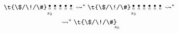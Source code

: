 \begin{primjer}
\begin{multline}
    \t{\$/\!/\#}
    \underset{\mathclap{s_2}}{\begin{array}{@{}c@{}}
    \text\textbullet\\
    \text\textopenbullet
    \end{array}}
    \begin{array}{@{}c@{}}
    \text\textbullet\\
    \text\textopenbullet
    \end{array}
    \begin{array}{@{}c@{}}
    \text\textbullet\\
    \text\textopenbullet
    \end{array}
    \begin{array}{@{}c@{}}
    \text\textbullet\\
    \text\textopenbullet
    \end{array}
    \begin{array}{@{}c@{}}
    \text\textbullet\\
    \text\textopenbullet
    \end{array}
        \leadsto^*
    \t{\$/\!/\#}
    \underset{\mathclap{s_3}}{\begin{array}{@{}c@{}}
    \text\textbullet\\
    \text\textopenbullet
    \end{array}}
    \begin{array}{@{}c@{}}
    \text\textbullet\\
    \text\textopenbullet
    \end{array}
    \begin{array}{@{}c@{}}
    \text\textbullet\\
    \text\textopenbullet
    \end{array}
    \begin{array}{@{}c@{}}
    \text\textbullet\\
    \text\textopenbullet
    \end{array}
    \begin{array}{@{}c@{}}
    \text\textbullet\\
    \text\textopenbullet
    \end{array}
    \begin{array}{@{}c@{}}
    \text\textbullet\\
    \text\textopenbullet
    \end{array}
        \leadsto^*\\
\renewcommand{\arraystretch}{0.1}
        \leadsto^*
    \t{\$/\!/\#}
    \underset{\mathclap{s_0}}{\begin{array}{@{}c@{}}

\end{array}}
\end{multline}
\end{primjer}
